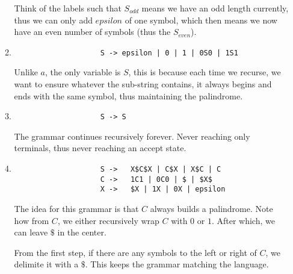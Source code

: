 \documentclass{article}
\begin{document}
\begin{enumerate}
\begin{enumerate}
                Think of the labels such that $S_{odd}$ means we have an odd length currently, thus we can only add $epsilon$ of one symbol, which then means we now have an even number of symbols (thus the $S_{even}$).
            \item
                \begin{lstlisting}
                    S -> epsilon | 0 | 1 | 0S0 | 1S1
                \end{lstlisting}

                Unlike $a$, the only variable is $S$, this is because each time we recurse, we want to ensure whatever the sub-string contains, it always begins and ends with the same symbol, thus maintaining the palindrome.
            \item
                \begin{lstlisting}
                    S -> S
                \end{lstlisting}

                The grammar continues recursively forever.
                Never reaching only terminals, thus never reaching an accept state.
            \item
                \begin{lstlisting}
                    S ->   X$C$X | C$X | X$C | C
                    C ->   1C1 | 0C0 | $ | $X$
                    X ->   $X | 1X | 0X | epsilon
                \end{lstlisting}

                The idea for this grammar is that $C$ always builds a palindrome.
                Note how from $C$, we either recursively wrap $C$ with $0$ or $1$.
                After which, we can leave $\$$ in the center.

                From the first step, if there are any symbols to the left or right of $C$, we delimite it with a $\$$.
                This keeps the grammar matching the language.


\end{enumerate}
\end{enumerate}
\end{document}

